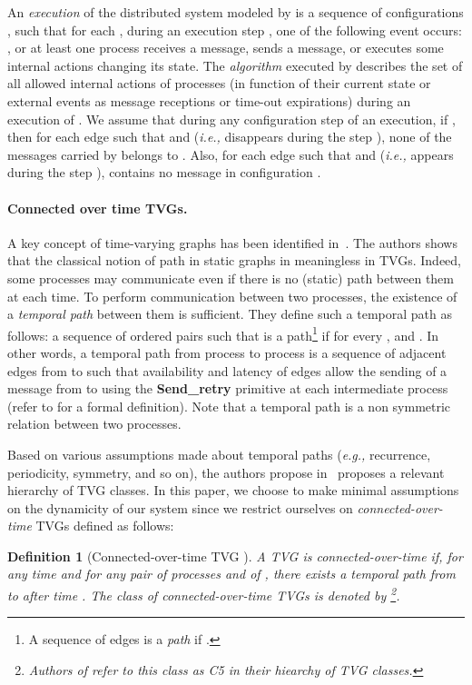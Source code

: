 \documentclass[11pt]{article}
\newtheorem{definition}{Definition}
\newcommand{\ie}{{\em i.e.,}\xspace}
\newcommand{\eg}{{\em e.g.,}\xspace}
\begin{document}
An {\em execution} of the distributed system modeled by  is a sequence of configurations  , such that for each , during an execution step , one of the following event occurs:  , or  at least one process receives a message, sends a message, or executes some internal actions changing its state. The \emph{algorithm} executed by  describes the set of all allowed internal actions of processes (in function of their current state or external events as message receptions or time-out expirations) during an execution of . We assume that during any configuration step  of an execution, if  , then for each edge  such that   and  (\ie  disappears during the step ), none of the messages carried by  belongs to . Also, for each edge  such that   and  (\ie  appears during the step ),  contains no message in configuration . 

\paragraph{Connected over time TVGs.} A key concept of time-varying graphs has been identified in~\cite{CFQS12}. The authors shows that the classical notion of path in static graphs in meaningless in TVGs. Indeed, some processes may communicate even if there is no (static) path between them at each time. To perform communication between two processes, the existence of a \emph{temporal path} between them is sufficient. They define such a temporal path as follows: a sequence of ordered pairs  such that  is a path\footnote{A sequence of edges  is a \emph{path} if  .} if for every ,  and . In other words, a temporal path from process  to process  is a sequence of adjacent edges from  to  such that availability and latency of edges allow the sending of a message from  to  using the \textbf{Send\_retry} primitive at each intermediate process (refer to \cite{CFQS12} for a formal definition). Note that a temporal path is a non symmetric relation between two processes.

Based on various assumptions made about temporal paths (\eg recurrence, periodicity, symmetry, and so on), the authors propose in~\cite{CFQS12} proposes a relevant hierarchy of TVG classes. In this paper, we choose to make minimal assumptions on the dynamicity of our system since we restrict ourselves on \emph{connected-over-time} TVGs defined as follows: 

\begin{definition}[Connected-over-time TVG \cite{CFQS12}]\label{def:COT}
A TVG  is connected-over-time if, for any time  and for any pair of processes  and  of , there exists a temporal path from  to  after time . The class of connected-over-time TVGs is denoted by \footnote{Authors of \cite{CFQS12} refer to this class as C5 in their hiearchy of TVG classes.}.
\end{definition}
\end{document}
